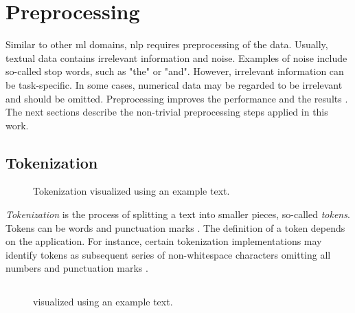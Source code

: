 \section{Preprocessing}\label{sec:preprocessing}

Similar to other \ac{ml} domains, \ac{nlp} requires preprocessing of the data.
Usually, textual data contains irrelevant information and noise.
Examples of noise include so-called stop words, such as "the" or "and".
However, irrelevant information can be task-specific. 
In some cases, numerical data may be regarded to be irrelevant and should be omitted.
Preprocessing improves the performance and the results \cite{clusteringDocs2020}.
The next sections describe the non-trivial preprocessing steps applied in this work.


\subsection{Tokenization}\label{subsec:tokenization}

\begin{figure}[!htb] %
    \centering
    
    \caption[Tokenization]{Tokenization visualized using an example text.}
    \label{fig:preproc-tokenization}
\end{figure}

\textit{Tokenization} is the process of splitting a text into smaller pieces, so-called \textit{tokens}.
Tokens can be words and punctuation marks \cite{nlp-book2009}.
The definition of a token depends on the application.
For instance, certain tokenization implementations may identify tokens as subsequent series of non-whitespace characters omitting all numbers and punctuation marks \cite{IR2011}.




\subsection{\stopWordRemoval{}}\label{subsec:stop-word-removal}

\begin{figure}[!htb] %
    \centering
    
    \caption[\stopWordRemoval{}]{\stopWordRemoval{} visualized using an example text.}
    \label{fig:preproc-stop-word-removal}
\end{figure}

